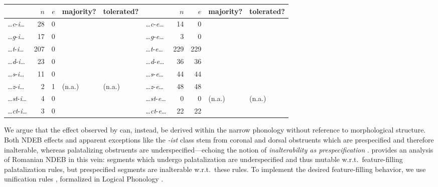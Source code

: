 \documentclass[11pt,letterpaper]{article}
\newcommand{\word}[1]{\textit{#1}}
\newcommand{\term}[1]{\textit{#1}}
\newcommand{\y}{\ding{51}}
\newcommand{\n}{\ding{55}}
\begin{document}
\begin{unlabeledexample}
\begin{tabular}{lrrll lrrll}
 & $n$ & $e$ & majority? & tolerated?
 & & $n$ & $e$ & majority? & tolerated? \\
\midrule
\ldots\word{c}-\word{i}\ldots  &  28 &   0 & \y & \y
 & \ldots\word{c}-\word{e}\ldots  &  14 &   0 & \y & \y \\
\ldots\word{g}-\word{i}\ldots  &  17 &   0 & \y & \y
 & \ldots\word{g}-\word{e}\ldots  &   3 &   0 & \y & \y \\
\ldots\word{t}-\word{i}\ldots  & 207 &   0 & \y & \y
 & \ldots\word{t}-\word{e}\ldots  & 229 & 229 & \n & \n \\
\ldots\word{d}-\word{i}\ldots  &  23 &   0 & \y & \y
 & \ldots\word{d}-\word{e}\ldots  &  36 &  36 & \n & \n \\
\ldots\word{s}-\word{i}\ldots  &  11 &   0 & \y & \y
 & \ldots\word{s}-\word{e}\ldots  &  44 &  44 & \n & \n \\
\ldots\word{z}-\word{i}\ldots  &   2 &   1 & (n.a.) & (n.a.)
 & \ldots\word{z}-\word{e}\ldots  &  48 &  48 & \n & \n \\
\ldots\word{st}-\word{i}\ldots &   4 &   0 & \y & \y
 & \ldots\word{st}-\word{e}\ldots &   0 &   0 & (n.a.) & (n.a.) \\
\ldots\word{ct}-\word{i}\ldots &   3 &   0 & \y & \y
 & \ldots\word{ct}-\word{e}\ldots &  22 &  22 & \n & \n \\
\end{tabular}
\label{e:productivity}
\end{unlabeledexample}

We argue that the  effect observed by \citet{Steriade:08} can, instead, be derived within the narrow phonology without reference to morphological structure.
Both NDEB effects and apparent exceptions like the \word{-ist} class stem from coronal and dorsal obstruents which are prespecified and therefore inalterable,
whereas palatalizing obstruents are underspecified---echoing the notion of \term{inalterability as prespecification}
\citep[e.g.,][]{Inkelas:Cho:93,Kiparsky:93,Buckley:94,Inkelas:95,Inkelas:EtAl:97,Inkelas:00,Inkelas:14,Gorman:26}.
\citet{Rasin:25} provides an analysis of Romanian NDEB in this vein:
segments which undergo palatalization are underspecified and thus mutable w.r.t.~feature-filling palatalization rules,
but prespecified segments are inalterable w.r.t.~these rules.
To implement the desired feature-filling behavior, we use unification rules \citep{Bale:EtAl:14},
formalized in Logical Phonology
\citep[e.g.,][]{Bale:Reiss:18,Bale:EtAl:20,Reiss:21,Dabbous:EtAl:24,Leduc:EtAl:24,Reiss:24,Gorman:Reiss:25:Metaphony}.
\end{document}
